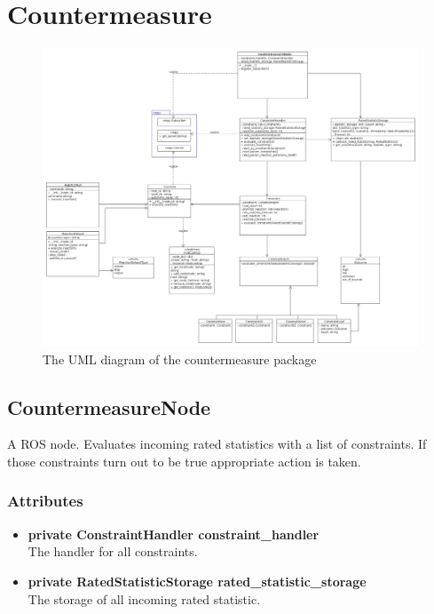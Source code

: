 \newpage
\section{Countermeasure}
\begin{figure}[!ht]
\begin{center}
\includegraphics[width=1.0\linewidth]{./diagram_pictures/reactor/reactor.jpg}
\caption{The UML diagram of the countermeasure package}
\end{center}
\end{figure}

\mbox{}

\newpage


\subsection{CountermeasureNode}
A ROS node. Evaluates incoming rated statistics with a list of constraints. If those constraints turn out to be true appropriate action is taken.
\subsubsection{Attributes}
\begin{itemize}
	\item \textbf{ private ConstraintHandler constraint\_handler}\\
		The handler for all constraints.
	\item \textbf{ private RatedStatisticStorage rated\_statistic\_storage}\\
		The storage of all incoming rated statistic.
\end{itemize}
